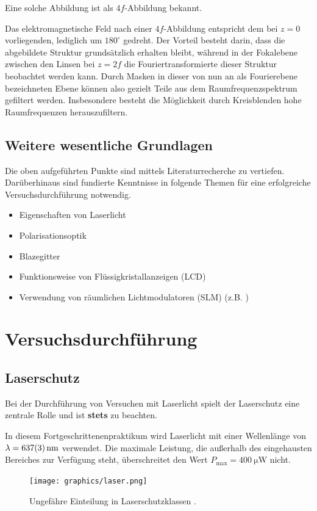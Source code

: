 \documentclass[
class=book,
accentcolor=1b,
custommargins=geometry,
fontsize=11pt,
thesis={type=Versuchsanleitung},
ruledheaders=all,
headline=false,
instbox=false,
marginpar=false,
title=small,
ignore-missing-data=true,
twoside=false,
pdfa=false %
]{apqpub}
\begin{document}
Eine solche Abbildung ist als $4f$-Abbildung bekannt.

Das elektromagnetische Feld nach einer $4f$-Abbildung entspricht dem bei $z = 0$ vorliegenden, lediglich um $180^\circ$ gedreht.
Der Vorteil besteht darin, dass die abgebildete Struktur grundsätzlich erhalten bleibt, während in der Fokalebene zwischen den Linsen bei $z = 2f$ die Fouriertransformierte dieser Struktur beobachtet werden kann.
Durch Masken in dieser von nun an als Fourierebene bezeichneten Ebene können also gezielt Teile aus dem Raumfrequenzspektrum gefiltert werden.
Insbesondere besteht die Möglichkeit durch Kreisblenden hohe Raumfrequenzen herauszufiltern.

\section{Weitere wesentliche Grundlagen}
Die oben aufgeführten Punkte sind mittels Literaturrecherche zu vertiefen.
Darüberhinaus sind fundierte Kenntnisse in folgende Themen für eine erfolgreiche Versuchsdurchführung notwendig.
\begin{itemize}
\item Eigenschaften von Laserlicht
\item Polarisationsoptik
\item Blazegitter
\item Funktionsweise von Flüssigkristallanzeigen (LCD) 
\item Verwendung von räumlichen Lichtmodulatoren (SLM) (z.B. \cite{Schaffner})

\end{itemize}
 
	\chapter{Versuchsdurchführung}
	\section{Laserschutz}
Bei der Durchführung von Versuchen mit Laserlicht spielt der Laserschutz eine zentrale Rolle und ist \textbf{stets} zu beachten.

In diesem Fortgeschrittenenpraktikum wird Laserlicht mit einer Wellenlänge von $\lambda = \SI{637 \pm 3}{\nano \metre}$ verwendet.
Die maximale Leistung, die außerhalb des eingehausten Bereiches zur Verfügung steht, überschreitet den Wert $P_{\text{max}} = \SI{400}{\micro \W}$ nicht.

\begin{figure}[H]
\centering
	\texttt{[image: graphics/laser.png]}
\caption{Ungefähre Einteilung in Laserschutzklassen \protect\cite{wikilaser}.}
\end{figure}
\end{document}
